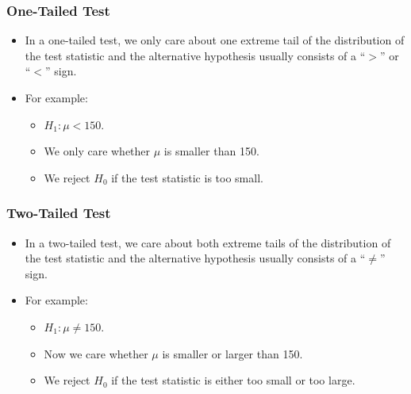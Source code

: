 \documentclass[12pt]{beamer}
\begin{document}
\begin{frame}
	\frametitle{One-Tailed Test}
	
	\begin{itemize}[label={\color{blue}$\blacktriangleright$}]
		\item In a one-tailed test, we only care about one extreme tail of the distribution of the test statistic and the alternative hypothesis usually consists of a ``$>$'' or ``$<$'' sign.
		
		\item For example:
		\begin{itemize}[label={\color{blue}$\blacktriangleright$}]
			\item $H_1 : \mu < 150$.
			\item We only care whether $\mu$ is smaller than 150.
			\item We reject $H_0$ if the test statistic is too small.
		\end{itemize}
	\end{itemize}
	
\end{frame}
\begin{frame}
	\frametitle{Two-Tailed Test}
	
	\begin{itemize}[label={\color{blue}$\blacktriangleright$}]
		\item In a two-tailed test, we care about both extreme tails of the distribution of the test statistic and the alternative hypothesis usually consists of a ``$\neq$'' sign.
		
		\item For example:
		\begin{itemize}[label={\color{blue}$\blacktriangleright$}]
			\item $H_1 : \mu \neq 150$.
			\item Now we care whether $\mu$ is smaller or larger than 150.
			\item We reject $H_0$ if the test statistic is either too small or too large.
		\end{itemize}
	\end{itemize}
	
\end{frame}
\end{document}
